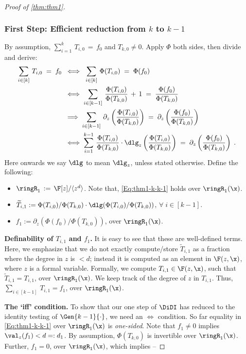 \begin{proof}[Proof of \autoref{thm:thm1}]
\subsubsection*{First Step: Efficient reduction from $k$ to $k-1$}
By assumption, $\sum_{i=1}^k\,T_{i,0}\,=\,f_{0}$ and $T_{k,0}\ne0$. Apply $\Phi$ both sides, then divide and derive:
\begin{align} \label{Eq:thm1-k-k-1}
    \sum_{i \in [k]}\,T_{i,0} \;=\; f_0 \; &\iff\;  \sum_{i \in [k]}\,\Phi(T_{i,0}) \;=\; \Phi(f_0) \nonumber\\ 
    &\iff  \sum_{i \in [k-1]}\, \frac{\Phi(T_{i,0})}{\Phi(T_{k,0})}\,+\, 1 \;=\; \frac{\Phi(f_0)}{\Phi(T_{k,0})} \nonumber\\ 
    &\implies \sum_{i \in [k-1]}\,\partial_{z} \left( \frac{\Phi(T_{i,0})}{\Phi(T_{k,0})}\right) \;=\; \partial_{z}\left(\frac{\Phi(f_0)}{\Phi(T_{k,0})}\right) \nonumber\\ 
&\iff \sum_{i=1}^{k-1}\,\frac{\Phi(T_{i,0})}{\Phi(T_{k,0})} \cdot \dlg_{z} \left( \frac{\Phi(T_{i,0})}{\Phi(T_{k,0})} \right) \;=\; \partial_{z} \left( \frac{\Phi(f_0)}{\Phi(T_{k,0})}\right)\;.
\end{align}
Here onwards we say \(\dlg\) to mean \(\dlg_z\), unless stated otherwise. Define the following:
\begin{itemize}
    \setlength\itemsep{1em}
    \item $\ringR_1\,:=\, \F[z]/\langle z^{d} \rangle$. Note that, \autoref{Eq:thm1-k-k-1} holds over $\ringR_1(\x)$.
    \item $\widetilde{T}_{i,1}:=\Phi(T_{i,0})/\Phi(T_{k,0}) \cdot \dlg (\Phi(T_{i,0})/\Phi(T_{k,0}))$, $\forall\;i \in [k-1]$.
    \item $ f_{1}:=\partial_{z}(\Phi(f_0)/\Phi(T_{k,0}))$, over $\ringR_1(\x)$.
\end{itemize}
\vspace*{1em}

\textbf{Definability of $T_{i,1}$ and $f_1$.} It is easy to see that these are well-defined terms. Here, we emphasize that we do not exactly compute/store $\widetilde{T}_{i,1}$ as a fraction where the degree in $z$ is $<d$; instead it is computed as an element in $\F(z,\x)$, where $z$ is a formal variable. Formally, we compute $T_{i,1} \in \F(z,\x)$, such that $\widetilde{T}_{i,1} = T_{i,1}$, over $\ringR_1(\x)$. We keep track of the degree of $z$ in $T_{i,1}$. 
Thus, $\sum_{i \in [k-1]}\,T_{i,1}=f_1$, over $\ringR_1(\x)$.

\vspace*{1em}
\textbf{The `iff' condition.} To show that our one step of $\DiDI$ has reduced to the identity testing of $\Gen{k-1}{\cdot}$, we need an $\iff$ condition. So far equality in \autoref{Eq:thm1-k-k-1} over $\ringR_1(\x)$ is \emph{one-sided}. Note that $f_{1} \ne 0$ implies $\val_{z}(f_{1}) < d=:d_1$. By assumption, $\Phi(T_{k,0})$ is invertible over $\ringR_1(\x)$. Further, $f_{1} = 0$, over $\ringR_1(\x)$, which implies --


\end{proof}
